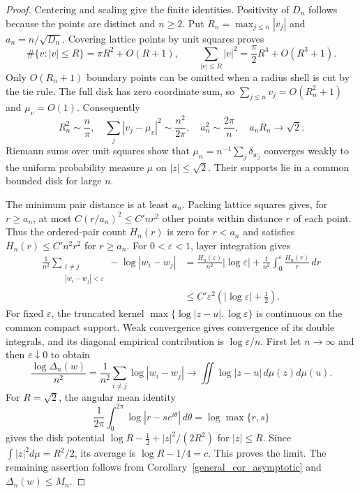 \documentclass[11pt]{article}
\theoremstyle{remark}
\numberwithin{equation}{section}
\begin{document}
\begin{proof}
Centering and scaling give the finite identities. Positivity of $D_n$
follows because the points are distinct and $n\ge2$.
Put $R_n=\max_{j\le n}|v_j|$ and $a_n=n/\sqrt{D_n}$.
Covering lattice points by unit squares proves
\[
 \#\{v:|v|\le R\}=\pi R^2+O(R+1),\qquad
 \sum_{|v|\le R}|v|^2=\frac\pi2R^4+O(R^3+1).
\]
Only $O(R_n+1)$ boundary points can be omitted when a radius shell
is cut by the tie rule. The full disk has zero coordinate sum, so
$\sum_{j\le n}v_j=O(R_n^2+1)$ and $\mu_v=O(1)$.
Consequently
\[
 R_n^2\sim\frac n\pi,\quad
 \sum_j|v_j-\mu_v|^2\sim\frac{n^2}{2\pi},\quad
 a_n^2\sim\frac{2\pi}{n},\quad a_nR_n\longrightarrow\sqrt2.
\]
Riemann sums over unit squares show that
$\mu_n=n^{-1}\sum_j\delta_{w_j}$ converges weakly to the uniform
probability measure $\mu$ on $|z|\le\sqrt2$.
Their supports lie in a common bounded disk for large $n$.

The minimum pair distance is at least $a_n$.
Packing lattice squares gives, for $r\ge a_n$, at most
$C(r/a_n)^2\le C'nr^2$ other points within distance $r$ of each point.
Thus the ordered-pair count $H_n(r)$ is zero for $r<a_n$ and
satisfies $H_n(r)\le C'n^2r^2$ for $r\ge a_n$.
For $0<\varepsilon<1$, layer integration gives
\begin{align*}
 \frac1{n^2}\sum_{\substack{i\ne j\\|w_i-w_j|<\varepsilon}}
       -\log|w_i-w_j|
 &=\frac{H_n(\varepsilon)}{n^2}|\log\varepsilon|
       +\frac1{n^2}\int_0^\varepsilon\frac{H_n(r)}r\,dr\\
 &\le C'\varepsilon^2
             \left(|\log\varepsilon|+\frac12\right).
\end{align*}
For fixed $\varepsilon$, the truncated kernel
$\max\{\log|z-u|,\log\varepsilon\}$ is continuous on the common
compact support. Weak convergence gives convergence of its double
integrals, and its diagonal empirical contribution is
$\log\varepsilon/n$.
First let $n\to\infty$ and then $\varepsilon\downarrow0$ to obtain
\[
 \frac{\log\Delta_n(w)}{n^2}
 =\frac1{n^2}\sum_{i\ne j}\log|w_i-w_j|
 \longrightarrow\iint\log|z-u|\,d\mu(z)d\mu(u).
\]
For $R=\sqrt2$, the angular mean identity
\[
 \frac1{2\pi}\int_0^{2\pi}\log|r-se^{i\theta}|\,d\theta
 =\log\max\{r,s\}
\]
gives the disk potential
$\log R-\tfrac12+|z|^2/(2R^2)$ for $|z|\le R$.
Since $\int|z|^2d\mu=R^2/2$, its average is $\log R-1/4=c$.
This proves the limit. The remaining assertion follows from
Corollary~\ref{general_cor_asymptotic} and $\Delta_n(w)\le M_n$.
\end{proof}
\end{document}
